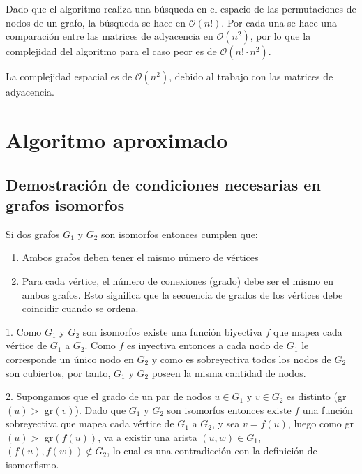 \documentclass[12pt,a4paper]{article}
\begin{document}
Dado que el algoritmo realiza una búsqueda en el espacio de las permutaciones de nodos de un grafo, la búsqueda se hace en $\mathcal{O}(n!)$. Por cada una se hace una comparación entre las matrices de adyacencia en $\mathcal{O}(n^2)$, por lo que la complejidad del algoritmo para el caso peor es de $\mathcal{O}(n! \cdot n^2)$.

La complejidad espacial es de $\mathcal{O}(n^2)$, debido al trabajo con las matrices de adyacencia.

\section{Algoritmo aproximado}
\subsection{ Demostración de condiciones necesarias en grafos isomorfos}

Si dos grafos $G_1$ y $G_2$ son isomorfos entonces cumplen que:

\begin{enumerate}
\item Ambos grafos deben tener el mismo número de vértices
\item Para cada vértice, el número de conexiones (grado) debe ser el mismo en ambos grafos. Esto significa que la secuencia de grados de los vértices debe coincidir cuando se ordena.

\end{enumerate}
1. Como $G_1$ y $G_2$ son isomorfos existe una función biyectiva $f$ que mapea cada vértice de $G_1$ a $G_2$. Como $f$ es inyectiva entonces a cada nodo de $G_1$ le corresponde un único nodo en $G_2$ y como es sobreyectiva todos los nodos de $G_2$ son cubiertos, por tanto, $G_1$ y $G_2$ poseen la misma cantidad de nodos.

2. Supongamos que el grado de un par de nodos $u \in G_1$ y $v \in G_2$ es distinto (gr$(u) >$ gr$(v)$). Dado que $G_1$ y $G_2$ son isomorfos entonces existe $f$ una función sobreyectiva que mapea cada vértice de $G_1$ a $G_2$, y sea $v = f(u)$, luego como gr$(u) >$ gr$(f(u))$, va a existir una arista $(u,w) \in G_1$, $(f(u),f(w)) \notin G_2$, lo cual es una contradicción con la definición de isomorfismo.
\end{document}
